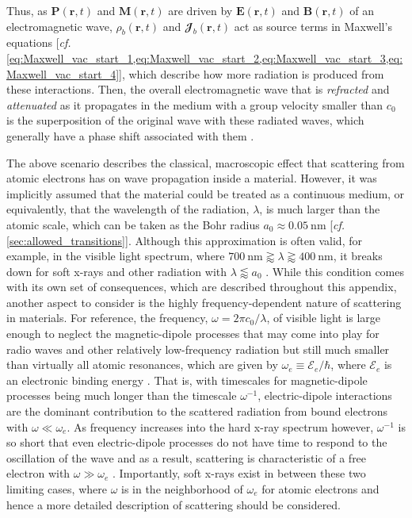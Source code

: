 Thus, as $\mathbold{P}(\mathbold{r},t)$ and $\mathbold{M}(\mathbold{r},t)$ are driven by $\mathbold{E}(\mathbold{r},t)$ and $\mathbold{B}(\mathbold{r},t)$ of an electromagnetic wave, $\rho_b(\mathbold{r},t)$ and $\mathbfcal{J}_b(\mathbold{r},t)$ act as source terms in Maxwell's equations [\emph{cf.\@} \cref{eq:Maxwell_vac_start_1,eq:Maxwell_vac_start_2,eq:Maxwell_vac_start_3,eq:Maxwell_vac_start_4}], which describe how more radiation is produced from these interactions. %
Then, the overall electromagnetic wave that is \emph{refracted} and \emph{attenuated} as it propagates in the medium with a group velocity smaller than $c_0$ is the superposition of the original wave with these radiated waves, which generally have a phase shift associated with them \cite{Jackson75,Rybicki86,Griffiths17}. 

The above scenario describes the classical, macroscopic effect that scattering from atomic electrons has on wave propagation inside a  material. 
However, it was implicitly assumed that the material could be treated as a continuous medium, or equivalently, that the wavelength of the radiation, $\lambda$, is much larger than the atomic scale, which can be taken as the Bohr radius $a_0 \approx \SI{0.05}{\nm}$ [\emph{cf.\@} \cref{sec:allowed_transitions}]. 
Although this approximation is often valid, for example, in the visible light spectrum, where $\SI{700}{\nm}\gtrapprox \lambda \gtrapprox \SI{400}{\nm}$, it breaks down for soft x-rays and other radiation with $\lambda \lessapprox a_0$  \cite{Landau60,Attwood17,Als-Nielsen11}. 
While this condition comes with its own set of consequences, which are described throughout this appendix, another aspect to consider is the highly frequency-dependent nature of scattering in materials. 
For reference, the frequency, $\omega = 2 \pi c_0 / \lambda$, of visible light is large enough to neglect the magnetic-dipole processes that may come into play for radio waves and other relatively low-frequency radiation but still much smaller than virtually all atomic resonances, which are given by $\omega_e \equiv \mathcal{E}_e / \hbar$, where $\mathcal{E}_e$ is an electronic binding energy \cite{Landau60,Jackson75}. 
That is, with timescales for magnetic-dipole processes being much longer than the timescale $\omega^{-1}$, electric-dipole interactions are the dominant contribution to the scattered radiation from bound electrons with $\omega \ll \omega_e$. 
As frequency increases into the hard x-ray spectrum however, $\omega^{-1}$ is so short that even electric-dipole processes do not have time to respond to the oscillation of the wave and as a result, scattering is characteristic of a free electron with $\omega \gg \omega_e$ \cite{Attwood17,Als-Nielsen11}. 
Importantly, soft x-rays exist in between these two limiting cases, where $\omega$ is in the neighborhood of $\omega_e$ for atomic electrons and hence a more detailed description of scattering should be considered. 

